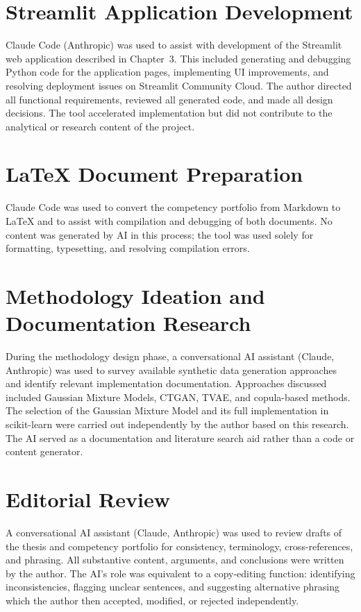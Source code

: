 \documentclass[11pt,a4paper]{report}
\begin{document}
\begin{appendices}
\section{Streamlit Application Development}

Claude Code (Anthropic) was used to assist with development of the Streamlit web application described in Chapter~3. This included generating and debugging Python code for the application pages, implementing UI improvements, and resolving deployment issues on Streamlit Community Cloud. The author directed all functional requirements, reviewed all generated code, and made all design decisions. The tool accelerated implementation but did not contribute to the analytical or research content of the project.

\section{\LaTeX{} Document Preparation}

Claude Code was used to convert the competency portfolio from Markdown to \LaTeX{} and to assist with compilation and debugging of both documents. No content was generated by AI in this process; the tool was used solely for formatting, typesetting, and resolving compilation errors.

\section{Methodology Ideation and Documentation Research}

During the methodology design phase, a conversational AI assistant (Claude, Anthropic) was used to survey available synthetic data generation approaches and identify relevant implementation documentation. Approaches discussed included Gaussian Mixture Models, CTGAN, TVAE, and copula-based methods. The selection of the Gaussian Mixture Model and its full implementation in scikit-learn were carried out independently by the author based on this research. The AI served as a documentation and literature search aid rather than a code or content generator.

\section{Editorial Review}

A conversational AI assistant (Claude, Anthropic) was used to review drafts of the thesis and competency portfolio for consistency, terminology, cross-references, and phrasing. All substantive content, arguments, and conclusions were written by the author. The AI's role was equivalent to a copy-editing function: identifying inconsistencies, flagging unclear sentences, and suggesting alternative phrasing which the author then accepted, modified, or rejected independently.


\end{appendices}
\end{document}
